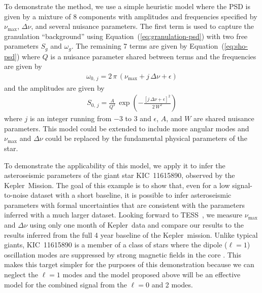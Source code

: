 \documentclass[manuscript, letterpaper]{aastex6}
\newcommand{\project}[1]{\textsf{#1}}
\newcommand{\kepler}{\project{Kepler}}
\newcommand{\tess}{\project{TESS}}
\renewcommand{\eqref}[1]{\ref{eq:#1}}
\newcommand{\Eq}[1]{Equation~(\eqref{#1})}
\newcommand{\eq}[1]{\Eq{#1}}
\begin{document}
To demonstrate the method, we use a simple heuristic model where the PSD is
given by a mixture of 8 components with amplitudes and frequencies specified
by $\nu_\mathrm{max}$, $\Delta \nu$, and several nuisance parameters.
The first term is used to capture the granulation ``background''
\citep{Kallinger:2014} using \eq{granulation-psd} with two free parameters
$S_g$ and $\omega_g$.
The remaining  7 terms are given by \eq{sho-psd} where $Q$ is a nuisance
parameter shared between terms and the frequencies are given by
\begin{eqnarray}
\omega_{0,\,j} = 2\,\pi\,(\nu_\mathrm{max} + j\,\Delta\nu + \epsilon)
\end{eqnarray}
and the amplitudes are given by
\begin{eqnarray}
S_{0,\,j} =
    \frac{A}{Q^2}\,\exp\left(-\frac{[j\,\Delta\nu + \epsilon]^2}{2\,W^2}\right)
\end{eqnarray}
where $j$ is an integer running from $-3$ to 3 and $\epsilon$, $A$, and $W$
are shared nuisance parameters.
This model could be extended to include more angular modes and
$\nu_\mathrm{max}$ and $\Delta \nu$ could be replaced by the fundamental
physical parameters of the star.

To demonstrate the applicability of this model, we apply it to infer the
asteroseismic parameters of the giant star KIC~11615890, observed by the
\kepler\ Mission.
The goal of this example is to show that, even for a low signal-to-noise
dataset with a short baseline, it is possible to infer asteroseismic
parameters with formal uncertainties that are consistent with the parameters
inferred with a much larger dataset.
Looking forward to \tess\ \citep{Ricker:2014,Campante:2016}, we measure
$\nu_\mathrm{max}$ and $\Delta\nu$ using only one month of \kepler\ data and
compare our results to the results inferred from the full 4 year baseline of
the \kepler\ mission.
Unlike typical giants, KIC~11615890 is a member of a class of stars where the
dipole ($\ell = 1$) oscillation modes are suppressed by strong magnetic fields
in the core \citep{Stello:2016}.
This makes this target simpler for the purposes of this demonstration because
we can neglect the $\ell = 1$ modes and the model proposed above will be an
effective model for the combined signal from the $\ell = 0$ and 2 modes.
\end{document}
